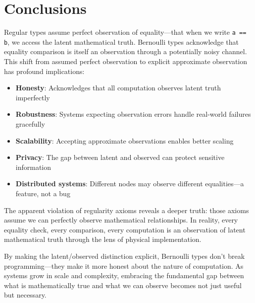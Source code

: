 \documentclass[11pt,final,hidelinks]{article}
\newcommand{\code}[1]{\texttt{#1}}
\begin{document}
\section{Conclusions}

Regular types assume perfect observation of equality—that when we write \code{a == b}, we access the latent mathematical truth. Bernoulli types acknowledge that equality comparison is itself an observation through a potentially noisy channel. This shift from assumed perfect observation to explicit approximate observation has profound implications:

\begin{itemize}
    \item \textbf{Honesty}: Acknowledges that all computation observes latent truth imperfectly
    \item \textbf{Robustness}: Systems expecting observation errors handle real-world failures gracefully
    \item \textbf{Scalability}: Accepting approximate observations enables better scaling
    \item \textbf{Privacy}: The gap between latent and observed can protect sensitive information
    \item \textbf{Distributed systems}: Different nodes may observe different equalities—a feature, not a bug
\end{itemize}

The apparent violation of regularity axioms reveals a deeper truth: those axioms assume we can perfectly observe mathematical relationships. In reality, every equality check, every comparison, every computation is an observation of latent mathematical truth through the lens of physical implementation.

By making the latent/observed distinction explicit, Bernoulli types don't break programming—they make it more honest about the nature of computation. As systems grow in scale and complexity, embracing the fundamental gap between what is mathematically true and what we can observe becomes not just useful but necessary.


\end{document}
